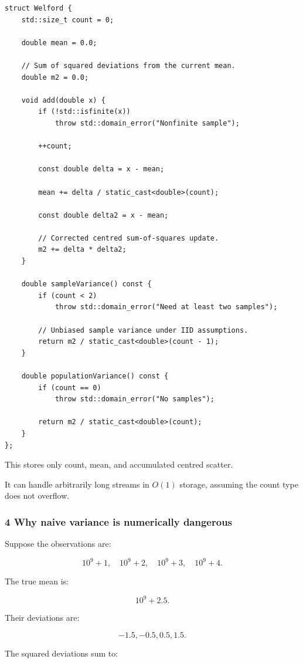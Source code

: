 \begin{verbatim}
struct Welford {
    std::size_t count = 0;

    double mean = 0.0;

    // Sum of squared deviations from the current mean.
    double m2 = 0.0;

    void add(double x) {
        if (!std::isfinite(x))
            throw std::domain_error("Nonfinite sample");

        ++count;

        const double delta = x - mean;

        mean += delta / static_cast<double>(count);

        const double delta2 = x - mean;

        // Corrected centred sum-of-squares update.
        m2 += delta * delta2;
    }

    double sampleVariance() const {
        if (count < 2)
            throw std::domain_error("Need at least two samples");

        // Unbiased sample variance under IID assumptions.
        return m2 / static_cast<double>(count - 1);
    }

    double populationVariance() const {
        if (count == 0)
            throw std::domain_error("No samples");

        return m2 / static_cast<double>(count);
    }
};
\end{verbatim}

This stores only count, mean, and accumulated centred scatter.

It can handle arbitrarily long streams in \(O(1)\) storage, assuming the count type does not overflow.

\subsubsection{4 Why naive variance is numerically dangerous}\label{02-foundations-ii-ch030-why-naive-variance-is-numerically-dangerous}

Suppose the observations are:

\[
 10^9+1,\quad10^9+2,\quad10^9+3,\quad10^9+4.
\]

The true mean is:

\[
 10^9+2.5.
\]

Their deviations are:

\[
 -1.5,-0.5,0.5,1.5.
\]

The squared deviations sum to:

